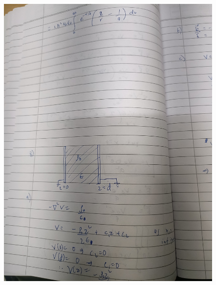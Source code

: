 \documentclass{article}
\begin{document}
\begin{figure}[H]
    \centering
    \includegraphics[width=\textwidth]{figs/written/13.jpg}
\end{figure}
\end{document}
